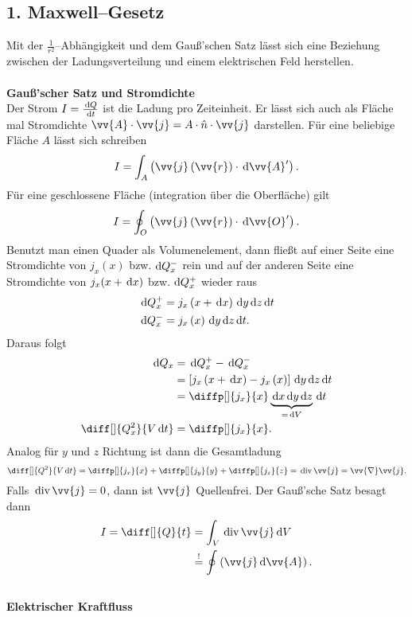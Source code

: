 \subsection{1. Maxwell--Gesetz}
Mit der $\tfrac{1}{r^2}$--Abhängigkeit und dem Gauß'schen Satz lässt sich eine Beziehung zwischen der Ladungsverteilung und einem elektrischen Feld herstellen.
\\\hfill\\\textbf{Gauß'scher Satz und Stromdichte}\\ 
Der Strom $I=\tfrac{\,\text{d} Q}{\,\text{d} t}$ ist die Ladung pro Zeiteinheit. Er lässt sich auch als Fläche mal Stromdichte $\vv{A}\cdot \vv{j}=A\cdot \hat{n}\cdot \vv{j}$ darstellen. Für eine beliebige Fläche $A$ lässt sich schreiben
\[ 
        I=\int_{A}^{}\left(\vv{j}\left(\vv{r}\right)\cdot \td \vv{A}'\right)
.\] 
Für eine geschlossene Fläche (integration über die Oberfläche) gilt
\[ 
        I=\oint_{O}^{}\left(\vv{j}\left(\vv{r}\right)\cdot \td \vv{O}'\right)
.\] 
Benutzt man einen Quader als Volumenelement, dann fließt auf einer Seite eine Stromdichte von $j_x(x)$ bzw.\,$\,\text{d} Q_x^-$ rein und auf der anderen Seite eine Stromdichte von $j_x(x+\,\text{d} x)$ bzw.\,$\,\text{d} Q_x^+$ wieder raus
\begin{align*}
        \,\text{d} Q_x^+&=j_x\left(x+\,\text{d} x\right)\,\text{d} y\,\text{d} z\,\text{d} t\\
        \,\text{d} Q_x^-&=j_x\left(x\right)\,\text{d} y\,\text{d} z\,\text{d} t
.\end{align*}
Daraus folgt
\begin{align*}
        \td Q_x&=\td Q_x^+-\td Q_x^-\\
               &=\left[j_x\left(x+\td x\right)-j_x\left(x\right)\right]\td y\td z\td t\\
               &=\diffp[]{j_x}{x}\underbrace{\td x\td y\td z}_{=\td V}\td t\\
        \diff[]{Q_x^2}{V\td t}&=\diffp[]{j_x}{x}
.\end{align*}
Analog für $y$ und $z$ Richtung ist dann die Gesamtladung
\[ 
        \diff[]{Q^2}{V\td t}=\diffp[]{j_x}{x}+\diffp[]{j_y}{y}+\diffp[]{j_z}{z}=\,\text{div}\,\vv{j}=\vv{\nabla }\vv{j}
.\] 
Falls $\,\text{div}\,\vv{j}=0$, dann ist $\vv{j}$ Quellenfrei. Der Gauß'sche Satz besagt dann
\begin{align*}
        I=\diff[]{Q}{t}&=\int_{V}^{}\,\text{div}\,\vv{j}\td V\\
                       &\stackrel{!}{=}\oint_{}^{}\left(\vv{j}\td \vv{A}\right) 
.\end{align*}
\hfill\\\textbf{Elektrischer Kraftfluss}\\ 
